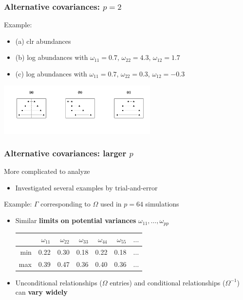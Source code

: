 \documentclass{beamer}
\begin{document}
\begin{frame}
\frametitle{Alternative covariances: $p = 2$}
Example:
\begin{itemize}
\item (a) clr abundances
\item (b) log abundances with $\omega_{11} = 0.7$, $\omega_{22} = 4.3$, $\omega_{12} = 1.7$
\item (c) log abundances with $\omega_{11} = 0.7$, $\omega_{22} = 0.3$, $\omega_{12} = -0.3$
\end{itemize}
\begin{center}
\includegraphics[width=300px]{figs/example-2.pdf}
\end{center}
\end{frame}

\begin{frame}
\frametitle{Alternative covariances: larger $p$}
More complicated to analyze\textellipsis
\begin{itemize}
\item Investigated several examples by trial-and-error
\end{itemize}
\pause
Example: $\Gamma$ corresponding to $\Omega$ used in $p = 64$ simulations
\begin{itemize}
\item Similar \textbf{limits on potential variances} $\omega_{11}, \dots, \omega_{pp}$
\begin{center}
\begin{tabular}{r|rrrrrr}
& $\omega_{11}$ & $\omega_{22}$ & $\omega_{33}$ & $\omega_{44}$ & $\omega_{55}$ & $\dots$ \\
\hline
min & 0.22 & 0.30 & 0.18 & 0.22 & 0.18 & $\dots$ \\
max & 0.39 & 0.47 & 0.36 & 0.40 & 0.36 & $\dots$
\end{tabular}
\end{center}
\item Unconditional relationships ($\Omega$ entries) and conditional relationships ($\Omega^{-1}$) can \textbf{vary widely}
\end{itemize}
\end{frame}
\end{document}
